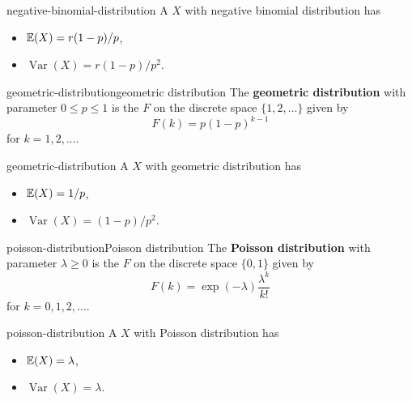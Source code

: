 \begin{example}{negative-binomial-distribution}
    A  $X$ with negative binomial distribution has
    \begin{itemize}
        \item {} $\mathbb{E}(X) = r (1 - p) / p$,
        \item {} $\operatorname{Var}(X) = r (1 - p) / p^2$.
    \end{itemize}
\end{example}

\begin{topic}{geometric-distribution}{geometric distribution}
    The \textbf{geometric distribution} with parameter $0 \le p \le 1$ is the  $F$ on the discrete space $\{ 1, 2, \ldots \}$ given by
    \[ F(k) = p (1 - p)^{k - 1} \]
    for $k = 1, 2, \ldots$.
\end{topic}

\begin{example}{geometric-distribution}
    A  $X$ with geometric distribution has
    \begin{itemize}
        \item {} $\mathbb{E}(X) = 1 / p$,
        \item {} $\operatorname{Var}(X) = (1 - p) / p^2$.
    \end{itemize}
\end{example}

\begin{topic}{poisson-distribution}{Poisson distribution}
    The \textbf{Poisson distribution} with parameter $\lambda \ge 0$ is the  $F$ on the discrete space $\{ 0, 1 \}$ given by
    \[ F(k) = \exp(-\lambda) \frac{\lambda^k}{k!} \]
    for $k = 0, 1, 2, \ldots$.
\end{topic}

\begin{example}{poisson-distribution}
    A  $X$ with Poisson distribution has
    \begin{itemize}
        \item {} $\mathbb{E}(X) = \lambda$,
        \item {} $\operatorname{Var}(X) = \lambda$.
    \end{itemize}
\end{example}

